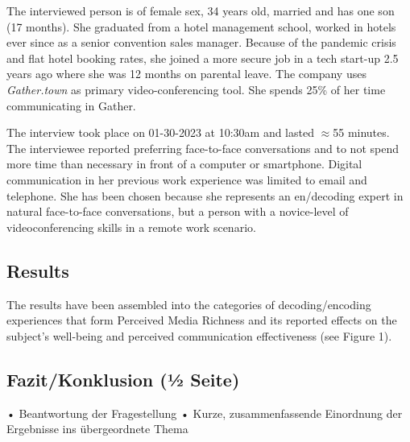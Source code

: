 \documentclass[man]{apa7}
\begin{document}
The interviewed person is of female sex, 34 years old, married and has one son (17 months). She graduated from a hotel management school, worked in hotels ever since as a senior convention sales manager. Because of the pandemic crisis and flat hotel booking rates, she joined a more secure job in a tech start-up 2.5 years ago where she was 12 months on parental leave. The company uses \textit{Gather.town} as primary video-conferencing tool. She spends 25\% of her time communicating in Gather.

The interview took place on 01-30-2023 at 10:30am and lasted $\approx$55 minutes. The interviewee reported preferring face-to-face conversations and to not spend more time than necessary in front of a computer or smartphone. Digital communication in her previous work experience was limited to email and telephone. She has been chosen because she represents an en/decoding expert in natural face-to-face conversations, but a person with a novice-level of videoconferencing skills in a remote work scenario. 

\subsection{Results}

The results have been assembled into the categories of decoding/encoding experiences that form Perceived Media Richness and its reported effects on the subject's well-being and perceived communication effectiveness (see Figure 1).

\subsection{Fazit/Konklusion (1⁄2 Seite)}
• Beantwortung der Fragestellung
• Kurze, zusammenfassende Einordnung der Ergebnisse ins übergeordnete Thema

\printbibliography

\appendix
\end{document}
